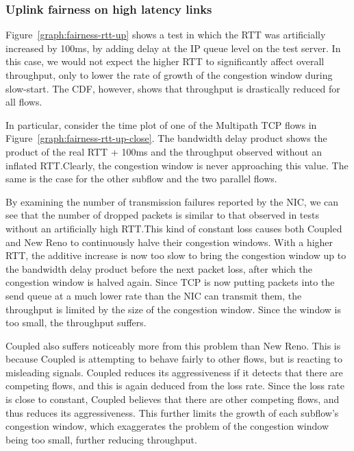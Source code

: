 \subsubsection{Uplink fairness on high latency links}
\label{sec:fairness:latency}

Figure~\ref{graph:fairness-rtt-up} shows a test in which the RTT was
artificially increased by 100ms, by adding delay at the IP queue level on the
test server. In this case, we would not expect the higher RTT to significantly
affect overall throughput, only to lower the rate of growth of the congestion
window during slow-start. The CDF, however, shows that throughput is drastically
reduced for all flows.

In particular, consider the time plot of one of the Multipath TCP flows in
Figure~\ref{graph:fairness-rtt-up-close}. The bandwidth delay product shows the
product of the real RTT + 100ms and the throughput observed without an inflated
RTT.\@ Clearly, the congestion window is never approaching this value. The same
is the case for the other subflow and the two parallel flows.

By examining the number of transmission failures reported by the NIC, we can see
that the number of dropped packets is similar to that observed in tests without
an artificially high RTT.\@ This kind of constant loss causes both Coupled and
New Reno to continuously halve their congestion windows. With a higher RTT, the
additive increase is now too slow to bring the congestion window up to the
bandwidth delay product before the next packet loss, after which the congestion
window is halved again. Since TCP is now putting packets into the send queue at
a much lower rate than the NIC can transmit them, the throughput is limited by
the size of the congestion window. Since the window is too small, the throughput
suffers.

Coupled also suffers noticeably more from this problem than New Reno. This is
because Coupled is attempting to behave fairly to other flows, but is reacting
to misleading signals. Coupled reduces its aggressiveness if it detects that
there are competing flows, and this is again deduced from the loss rate. Since
the loss rate is close to constant, Coupled believes that there are other
competing flows, and thus reduces its aggressiveness. This further limits the
growth of each subflow's congestion window, which exaggerates the problem of the
congestion window being too small, further reducing throughput.

